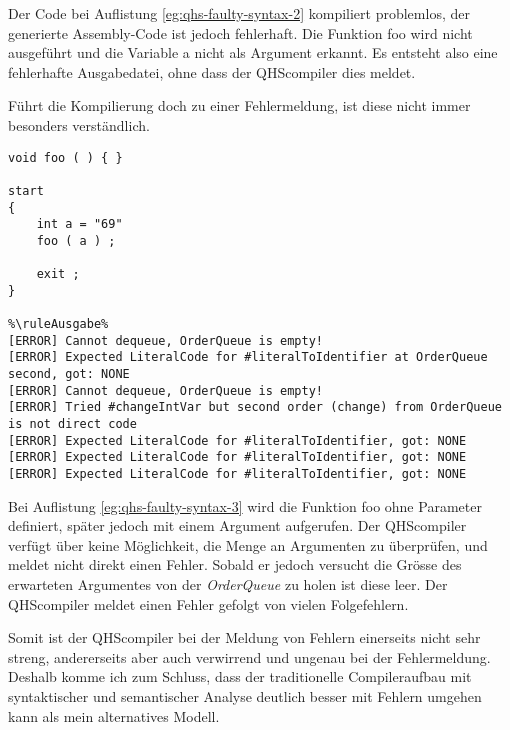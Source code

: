 Der Code bei Auflistung \ref{eg:qhs-faulty-syntax-2} kompiliert problemlos, der generierte Assembly-Code ist jedoch fehlerhaft. Die Funktion {\selectListingFont foo} wird nicht ausgeführt und die Variable a nicht als Argument erkannt.
Es entsteht also eine fehlerhafte Ausgabedatei, ohne dass der QHScompiler dies meldet.

Führt die Kompilierung doch zu einer Fehlermeldung, ist diese nicht immer besonders verständlich.

\begin{lstlisting}[language=QHS, caption=QHS mit falscher Anzahl Argumente, label=eg:qhs-faulty-syntax-3]
%\ruleEingabe%
void foo ( ) { }

start
{
    int a = "69" 
    foo ( a ) ;

    exit ;
}

%\ruleAusgabe%
[ERROR] Cannot dequeue, OrderQueue is empty!
[ERROR] Expected LiteralCode for #literalToIdentifier at OrderQueue second, got: NONE
[ERROR] Cannot dequeue, OrderQueue is empty!
[ERROR] Tried #changeIntVar but second order (change) from OrderQueue is not direct code
[ERROR] Expected LiteralCode for #literalToIdentifier, got: NONE
[ERROR] Expected LiteralCode for #literalToIdentifier, got: NONE
[ERROR] Expected LiteralCode for #literalToIdentifier, got: NONE
\end{lstlisting}

Bei Auflistung \ref{eg:qhs-faulty-syntax-3} wird die Funktion {\selectListingFont foo} ohne Parameter definiert, später jedoch mit einem Argument aufgerufen.
Der QHScompiler verfügt über keine Möglichkeit, die Menge an Argumenten zu überprüfen, und meldet nicht direkt einen Fehler. 
Sobald er jedoch versucht die Grösse des erwarteten Argumentes von der \textit{OrderQueue} zu holen ist diese leer.
Der QHScompiler meldet einen Fehler gefolgt von vielen Folgefehlern.


Somit ist der QHScompiler bei der Meldung von Fehlern einerseits nicht sehr streng, andererseits aber auch verwirrend und ungenau bei der Fehlermeldung.
Deshalb komme ich zum Schluss, dass der traditionelle Compileraufbau mit syntaktischer und semantischer Analyse deutlich besser mit Fehlern umgehen kann als mein alternatives Modell.

